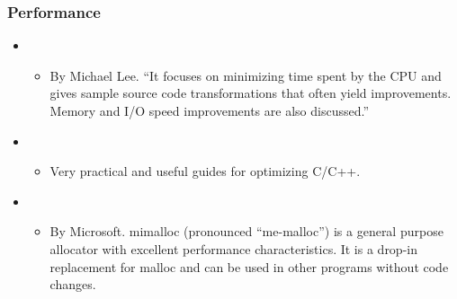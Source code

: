 \documentclass[letterpaper,10pt,english]{sphinxmanual}
\begin{document}
\subsubsection{Performance}
\label{\detokenize{resource/programing/clang_basic:performance}}\begin{itemize}
\item {} 
\begin{itemize}
\item {} 
By Michael Lee. “It focuses on minimizing time spent by the CPU
and gives sample source code transformations that often yield
improvements. Memory and I/O speed improvements are also
discussed.”

\end{itemize}

\item {} 
\begin{itemize}
\item {} 
Very practical and useful guides for optimizing C/C++.

\end{itemize}

\item {} 
\begin{itemize}
\item {} 
By Microsoft. mimalloc (pronounced “me-malloc”) is a general
purpose allocator with excellent performance characteristics. It
is a drop-in replacement for malloc and can be used in other
programs without code changes.

\end{itemize}

\end{itemize}
\end{document}
